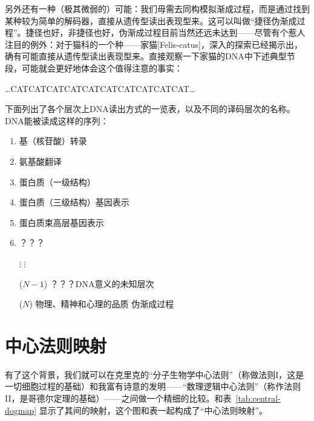 另外还有一种（极其微弱的）可能：我们毋需去同构模拟渐成过程，而是通过找到某种较为简单的解码器，直接从遗传型读出表现型来。这可以叫做“捷径伪渐成过程”。捷径也好，非捷径也好，伪渐成过程目前当然还远未达到——尽管有个惹人注目的例外：对于猫科的一个种——家猫[Felis-catus]，深入的探索已经揭示出，确有可能直接从遗传型读出表现型来。直接观察一下家猫的DNA中下述典型节段，可能就会更好地体会这个值得注意的事实：
\begin{center}
\ldots CATCATCATCATCATCATCATCATCATCAT\ldots
\end{center}
下面列出了各个层次上DNA读出方式的一览表，以及不同的译码层次的名称。DNA能被读成这样的序列：
\begin{enumerate}
\item 基（核苷酸）\dotfill 转录
\item 氨基酸\dotfill 翻译
\item 蛋白质（一级结构）
\item 蛋白质（三级结构）\dotfill 基因表示
\item 蛋白质束\dotfill 高层基因表示
\item ？？？
\item[\quad$\vdots$]$\vdots$
\item[($N-1$)] ？？？\dotfill DNA意义的未知层次
\item[($N$)] 物理、精神和心理的品质 \dotfill 伪渐成过程
\end{enumerate}

\section{中心法则映射}

有了这个背景，我们就可以在克里克的“分子生物学中心法则”（称做法则I，这是一切细胞过程的基础）和我富有诗意的发明——“数理逻辑中心法则”（称作法则II，是哥德尔定理的基础）——之间做一个精细的比较。和表~\ref{tab:central-dogmap} 显示了其间的映射，这个图和表一起构成了“中心法则映射”。

